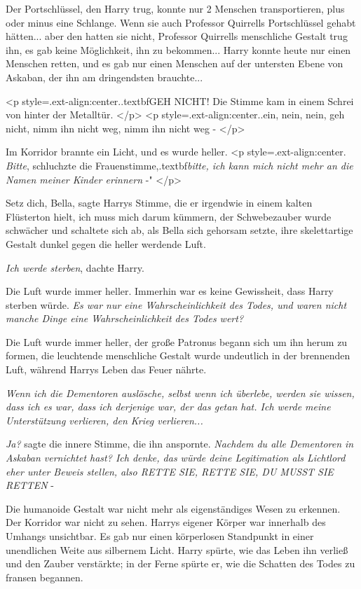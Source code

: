 Der Portschlüssel, den Harry trug, konnte nur 2 Menschen transportieren, plus
oder minus eine Schlange. Wenn sie auch Professor Quirrells Portschlüssel gehabt
hätten... aber den hatten sie nicht, Professor Quirrells menschliche Gestalt
trug ihn, es gab keine Möglichkeit, ihn zu bekommen... Harry konnte heute nur
einen Menschen retten, und es gab nur einen Menschen auf der untersten Ebene von
Askaban, der ihn am dringendsten brauchte...

<p style=\grqq{}.ext-align:center\grqq{}.\grqq{}.textbf{GEH NICHT!}\grqq{} Die
Stimme kam in einem Schrei von hinter der Metalltür. </p> <p
style=\grqq{}.ext-align:center\grqq{}.\grqq{}.ein, nein, nein, geh nicht, nimm
ihn nicht weg, nimm ihn nicht weg -\grqq{} </p>

Im Korridor brannte ein Licht, und es wurde heller. <p
style=\grqq{}.ext-align:center\grqq{}. \glqq \emph{Bitte}\grqq{}, schluchzte die
Frauenstimme,\grqq{}.textbf{\emph{bitte, ich kann mich nicht mehr an die Namen
meiner Kinder erinnern }}-" </p>

\glqq Setz dich, Bella\grqq{}, sagte Harrys Stimme, die er irgendwie in einem
kalten Flüsterton hielt, \glqq ich muss mich darum kümmern\grqq{}, der
Schwebezauber wurde schwächer und schaltete sich ab, als Bella sich gehorsam
setzte, ihre skelettartige Gestalt dunkel gegen die heller werdende Luft.

\emph{Ich werde sterben}, dachte Harry.

Die Luft wurde immer heller. Immerhin war es keine Gewissheit, dass Harry
sterben würde. \emph{Es war nur eine Wahrscheinlichkeit des Todes, und waren
nicht manche Dinge eine Wahrscheinlichkeit des Todes wert?}

Die Luft wurde immer heller, der große Patronus begann sich um ihn herum zu
formen, die leuchtende menschliche Gestalt wurde undeutlich in der brennenden
Luft, während Harrys Leben das Feuer nährte.

\emph{Wenn ich die Dementoren auslösche, selbst wenn ich überlebe, werden sie wissen, dass ich es war, dass ich derjenige war, der das getan hat. Ich werde meine Unterstützung verlieren, den Krieg verlieren...}

\emph{Ja?} sagte die innere Stimme, die ihn anspornte. \emph{Nachdem du alle
Dementoren in Askaban vernichtet hast? Ich denke, das würde deine Legitimation
als Lichtlord eher unter Beweis stellen, also RETTE SIE, RETTE SIE, DU MUSST SIE
RETTEN }-

Die humanoide Gestalt war nicht mehr als eigenständiges Wesen zu erkennen. Der
Korridor war nicht zu sehen. Harrys eigener Körper war innerhalb des Umhangs
unsichtbar. Es gab nur einen körperlosen Standpunkt in einer unendlichen Weite
aus silbernem Licht. Harry spürte, wie das Leben ihn verließ und den Zauber
verstärkte; in der Ferne spürte er, wie die Schatten des Todes zu fransen
begannen.

